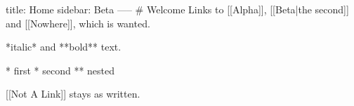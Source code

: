 title: Home
sidebar: Beta
-----
# Welcome
Links to [[Alpha]], [[Beta|the second]] and [[Nowhere]], which is wanted.

*italic* and **bold** text.

* first
* second
** nested

[[Not A Link]] stays as written.
